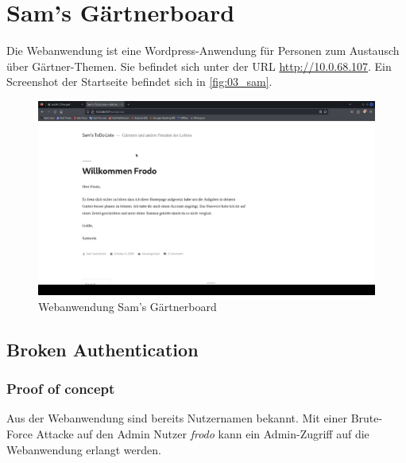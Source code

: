 \pagebreak
\chapter{Sam's Gärtnerboard}
Die Webanwendung ist eine Wordpress-Anwendung für Personen zum Austausch über Gärtner-Themen. Sie befindet sich unter der URL \url{http://10.0.68.107}. Ein Screenshot der Startseite befindet sich in \autoref{fig:03_sam}.

\vfill
\begin{figure}[!ht]
    \centering
    \includegraphics[width=\linewidth]{images/screenshots/05_sams_gaertnerborad.png}
    \caption{Webanwendung Sam's Gärtnerboard}
    \label{fig:03_sam}
\end{figure}
\vfill
\newpage


\section{\makecvssbadge Broken Authentication}

\subsection*{Proof of concept}
Aus der Webanwendung sind bereits Nutzernamen bekannt. Mit einer Brute-Force Attacke auf den Admin Nutzer \textit{frodo} kann ein Admin-Zugriff auf die Webanwendung erlangt werden.

